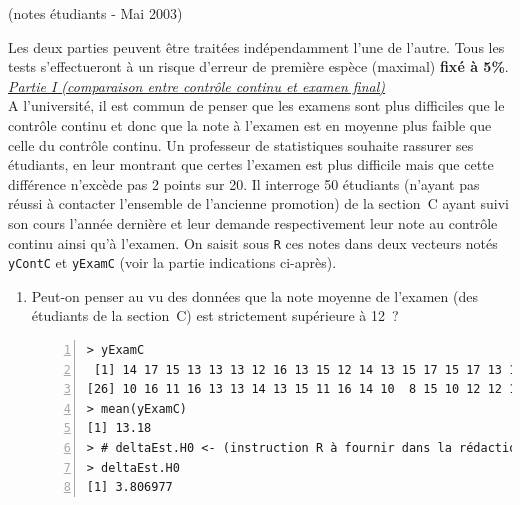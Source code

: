 \documentclass[10pt]{report}
\begin{document}
\begin{exercice} (notes étudiants - Mai 2003)

Les deux parties peuvent {\^e}tre trait{\'e}es ind{\'e}pendamment l'une de l'autre. Tous les tests s'effectueront {\`a} un risque d'erreur de premi{\`e}re esp{\`e}ce (maximal) \textbf{fix{\'e} {\`a} 5\%}.\\

\noindent \underline{\textit{Partie I (comparaison entre contr{\^o}le continu et examen final)}} \\

A l'universit{\'e}, il est commun de penser que les examens sont plus difficiles que le contr{\^o}le continu et donc que la note {\`a} l'examen est en moyenne plus faible que celle du contr{\^o}le continu. Un professeur de statistiques souhaite rassurer ses {\'e}tudiants, en leur montrant que certes l'examen est plus difficile mais que cette diff{\'e}rence n'exc{\`e}de pas 2 points sur 20. Il interroge 50 {\'e}tudiants (n'ayant pas r{\'e}ussi {\`a} contacter l'ensemble de l'ancienne promotion) de la section~C ayant suivi son cours l'ann{\'e}e derni{\`e}re et leur demande respectivement leur note au contr{\^o}le continu ainsi qu'{\`a} l'examen. On saisit sous \texttt{R} ces notes dans deux vecteurs not{\'e}s \texttt{yContC} et \texttt{yExamC} (voir la partie indications ci-apr{\`e}s). \\

\begin{enumerate}
\item Peut-on penser au vu des donn{\'e}es que la note moyenne de l'examen (des {\'e}tudiants de la section~C) est strictement sup{\'e}rieure {\`a} 12~?

\IndicR
\begin{Verbatim}[frame=leftline,fontfamily=tt,fontshape=n,numbers=left]
> yExamC
 [1] 14 17 15 13 13 13 12 16 13 15 12 14 13 15 17 15 17 13 13 12 15 14 12 13  9
[26] 10 16 11 16 13 13 14 13 15 11 16 14 10  8 15 10 12 12 12 15 10 15  9 13 11
> mean(yExamC)
[1] 13.18
> # deltaEst.H0 <- (instruction R à fournir dans la rédaction)
> deltaEst.H0
[1] 3.806977
\end{Verbatim}

 




\end{enumerate}
\end{exercice}
\end{document}
